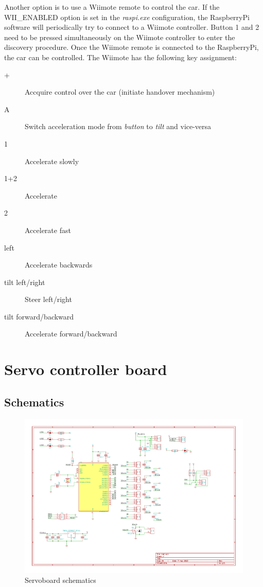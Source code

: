 \documentclass[12pt]{article}
\begin{document}
Another option is to use a Wiimote remote to control the car. If the WII\_ENABLED option is set in the \textit{raspi.exe} configuration, the RaspberryPi software will periodically try to connect to a Wiimote controller.
Button 1 and 2 need to be pressed simultaneously on the Wiimote controller to enter the discovery procedure.
Once the Wiimote remote is connected to the RaspberryPi, the car can be controlled.
The Wiimote has the following key assignment:
\begin{description}
\item[+] Accquire control over the car (initiate handover mechanism)
\item[A] Switch acceleration mode from \textit{button} to \textit{tilt} and vice-versa
\item[1] Accelerate slowly
\item[1+2] Accelerate
\item[2] Accelerate fast
\item[left] Accelerate backwards
\item[tilt left/right] Steer left/right
\item[tilt forward/backward] Accelerate forward/backward
\end{description}

\section{Servo controller board}

\subsection{Schematics}

\begin{figure}[h]
\begin{center}
\includegraphics[width=20cm,angle=-90]{pic/servoboard}
\caption{Servoboard schematics}
\end{center}
\label{figservoboardscm}
\end{figure}
\end{document}
